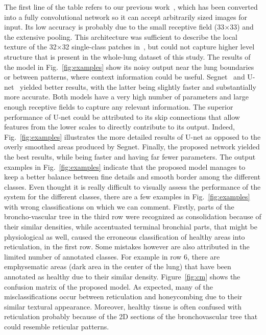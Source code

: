 \documentclass[journal]{IEEEtran}
\begin{document}
The first line of the table refers to our previous work~\cite{AnthimoTMI}, which has been converted into a fully convolutional network so it can accept arbitrarily sized images for input. Its low accuracy is probably due to the small receptive field (33$\times$33) and the extensive pooling. This architecture was sufficient to describe the local texture of the 32$\times$32 single-class patches in~\cite{AnthimoTMI}, but could not capture higher level structure that is present in the whole-lung dataset of this study. The results of the model in Fig.~\ref{fig:examples} show its noisy output near the lung boundaries or between patterns, where context information could be useful. Segnet~\cite{badrinarayanan2015segnet} and U-net~\cite{Unet} yielded better results, with the latter being slightly faster and substantially more accurate. Both models have a very high number of parameters and large enough receptive fields to capture any relevant information. The superior performance of U-net could be attributed to its skip connections that allow features from the lower scales to directly contribute to its output. Indeed, Fig.~\ref{fig:examples} illustrates the more detailed results of U-net as opposed to the overly smoothed areas produced by Segnet. Finally, the proposed network yielded the best results, while being faster and having far fewer parameters. The output examples in Fig.~\ref{fig:examples} indicate that the proposed model manages to keep a better balance between fine details and smooth border among the different classes. Even thought it is really difficult to visually assess the performance of the system for the different classes, there are a few examples in Fig.~\ref{fig:examples} with wrong classifications on which we can comment. Firstly, parts of the broncho-vascular tree in the third row were recognized as consolidation because of their similar densities, while accentuated terminal bronchial parts, that might be physiological as well, caused the erroneous classification of healthy areas into reticulation, in the first row. Some mistakes however are also attributed in the limited number of annotated classes. For example in row 6, there are emphysematic areas (dark area in the center of the lung) that have been annotated as healthy due to their similar density. Figure~\ref{fig:cm} shows the confusion matrix of the proposed model. As expected, many of the misclassifications occur between reticulation and honeycombing due to their similar textural appearance. Moreover, healthy tissue is often confused with reticulation probably because of the 2D sections of the bronchovascular tree that could resemble reticular patterns.
\end{document}
